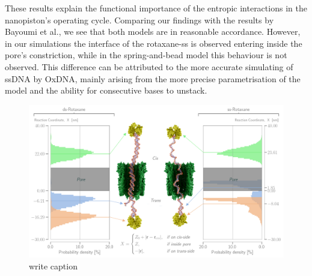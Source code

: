 These results explain the functional importance of the entropic interactions in the
nanopiston's operating cycle. Comparing our findings with the results by Bayoumi et al.,
we see that both models are in reasonable accordance. However, in our simulations the
interface of the rotaxane-ss is observed entering inside the pore's constriction, while
in the spring-and-bead model this behaviour is not observed. This difference can be
attributed to the more accurate simulating of ssDNA by OxDNA, mainly arising from the
more precise parametrisation of the model and the ability for consecutive bases to
unstack.

\begin{figure}[ht!]
\begin{center}
  \includegraphics[width=1\textwidth]{Figures/RotaxaneFluctuations.png}
  \caption{write caption}
\end{center}
\end{figure}
